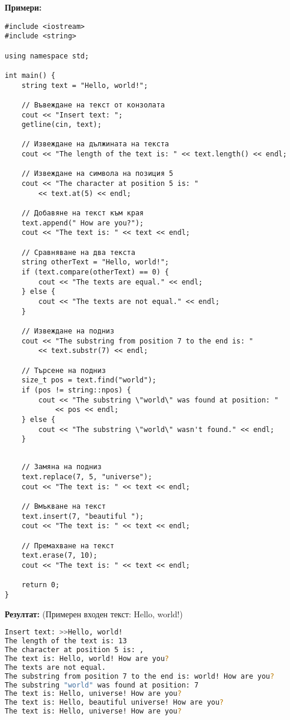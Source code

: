 \documentclass[oneside]{book}
\begin{document}
\textbf{Примери:}
\begin{mdframed}\begin{lstlisting}
#include <iostream>
#include <string>

using namespace std;

int main() {
    string text = "Hello, world!";

    // Въвеждане на текст от конзолата
    cout << "Insert text: ";
    getline(cin, text);

    // Извеждане на дължината на текста
    cout << "The length of the text is: " << text.length() << endl;

    // Извеждане на символа на позиция 5
    cout << "The character at position 5 is: "
        << text.at(5) << endl;

    // Добавяне на текст към края
    text.append(" How are you?");
    cout << "The text is: " << text << endl;

    // Сравняване на два текста
    string otherText = "Hello, world!";
    if (text.compare(otherText) == 0) {
        cout << "The texts are equal." << endl;
    } else {
        cout << "The texts are not equal." << endl;
    }

    // Извеждане на подниз
    cout << "The substring from position 7 to the end is: "
        << text.substr(7) << endl;

    // Търсене на подниз
    size_t pos = text.find("world");
    if (pos != string::npos) {
        cout << "The substring \"world\" was found at position: "
            << pos << endl;
    } else {
        cout << "The substring \"world\" wasn't found." << endl;
    }
\end{lstlisting}\end{mdframed}
\begin{mdframed}\begin{lstlisting}[firstnumber=last]
    
    // Замяна на подниз
    text.replace(7, 5, "universe");
    cout << "The text is: " << text << endl;

    // Вмъкване на текст
    text.insert(7, "beautiful ");
    cout << "The text is: " << text << endl;

    // Премахване на текст
    text.erase(7, 10);
    cout << "The text is: " << text << endl;

    return 0;
}
\end{lstlisting}\end{mdframed}

\textbf{Резултат:} (Примерен входен текст: Hello, world!)
\begin{mdframed}\begin{lstlisting}[language=bash]
Insert text: >>Hello, world!
The length of the text is: 13
The character at position 5 is: ,
The text is: Hello, world! How are you?
The texts are not equal.
The substring from position 7 to the end is: world! How are you?
The substring "world" was found at position: 7
The text is: Hello, universe! How are you?
The text is: Hello, beautiful universe! How are you?
The text is: Hello, universe! How are you?
\end{lstlisting}\end{mdframed}
\end{document}
